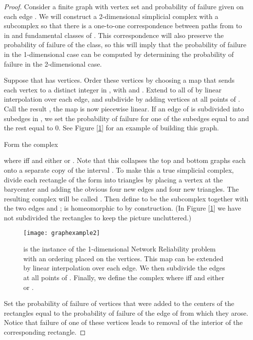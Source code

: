 \documentclass[10pt,twocolumn]{article} \usepackage{amsmath,epsf,amssymb,cite,pifont,amsthm, mathrsfs,epsfig,  bbm, amsthm,  setspace}
\renewcommand{\1}{\mathbbm{1}}
\begin{document}
\begin{proof}
Consider a finite graph  with vertex set  and  probability of failure
 given on each edge .
We will construct a 2-dimensional simplicial complex  with a subcomplex 
 so that there is a one-to-one correspondence between paths from  to  in 
  and fundamental classes of .
This correspondence will also preserve the probability of failure of the class,
so this will imply that the probability of failure in the 1-dimensional case can be computed by
determining the probability of failure in the 2-dimensional case.

Suppose that  has  vertices.
Order these vertices by choosing a map
 that sends each vertex to a distinct integer in
, with  and .
Extend  to all of  by linear interpolation over each edge,
and subdivide  by adding vertices at all points of .
Call the result , the map  is now piecewise linear.
If an edge  of  is subdivided into  subedges in ,
we set the probability of failure for one of the subedges equal to  and the rest equal to 0.  
See Figure [\ref{fig:graphexample}] for an example of building this graph.

Form the complex

where  iff  and either  or .
Note that this collapses the top and  bottom graphs each onto a separate copy of the interval
.
To make this a true simplicial complex, divide each rectangle of the form 
into triangles by placing a vertex at the barycenter and adding the obvious four new edges
and four new triangles.
The resulting complex will be called .
Then define  to be the subcomplex
 together with the two edges  and ;
 is homeomorphic to  by construction.
(In Figure [\ref{fig:graphexample}] we
have not subdivided the rectangles to keep the picture uncluttered.)


\begin{figure}[h]
\begin{center}
\texttt{[image: graphexample2]}
\end{center}
\caption{ is the instance of the 1-dimensional Network Reliability problem with an ordering  placed on the vertices.
This map can be extended by linear interpolation over each edge.
We then subdivide the edges at all points of .
Finally, we define the complex  where  iff 
and either  or .  }
\label{fig:graphexample}
\end{figure}

Set the probability of
failure of vertices that were added to the centers of the rectangles
equal to the probability of failure of the edge of  from which they arose.
Notice that failure of one of these vertices
leads to removal of the interior of the corresponding rectangle.


\end{proof}
\end{document}
